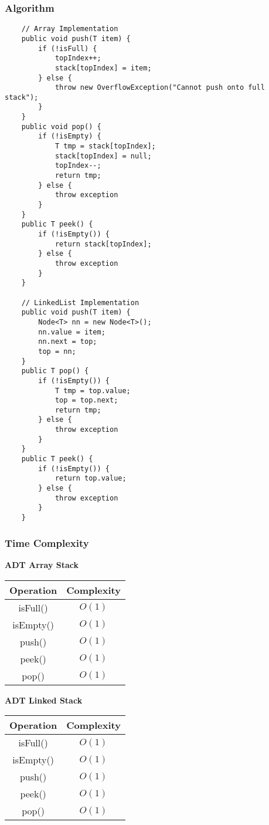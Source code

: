 \documentclass[10pt, 
a4paper, 
oneside, 
headinclude, footinclude, 
BCOR5mm]
{scrartcl}
\begin{document}
\subsubsection{Algorithm}
\begin{lstlisting}
    // Array Implementation
    public void push(T item) {
        if (!isFull) {
            topIndex++;
            stack[topIndex] = item;
        } else {
            throw new OverflowException("Cannot push onto full stack");
        }
    }
    public void pop() {
        if (!isEmpty) {
            T tmp = stack[topIndex];
            stack[topIndex] = null;
            topIndex--;
            return tmp;
        } else {
            throw exception
        }
    }
    public T peek() {
        if (!isEmpty()) {
            return stack[topIndex];
        } else {
            throw exception
        }
    }

    // LinkedList Implementation
    public void push(T item) {
        Node<T> nn = new Node<T>();
        nn.value = item;
        nn.next = top;
        top = nn;
    }
    public T pop() {
        if (!isEmpty()) {
            T tmp = top.value;
            top = top.next;
            return tmp;
        } else {
            throw exception
        }
    }
    public T peek() {
        if (!isEmpty()) {
            return top.value;
        } else {
            throw exception
        }
    }
\end{lstlisting}
\newpage
\subsubsection{Time Complexity}
\textbf{ADT Array Stack}
\begin{center}
    \begin{tabular}{|c|c|}
        \hline
        \textbf{Operation} & \textbf{Complexity} \\
        \hline
        isFull() & $O(1)$ \\
        \hline
        isEmpty() & $O(1)$ \\
        \hline
        push() & $O(1)$ \\
        \hline
        peek() & $O(1)$ \\
        \hline
        pop() & $O(1)$ \\
        \hline
    \end{tabular}
\end{center}
\textbf{ADT Linked Stack}
\begin{center}
    \begin{tabular}{|c|c|}
        \hline
        \textbf{Operation} & \textbf{Complexity} \\
        \hline
        isFull() & $O(1)$ \\
        \hline
        isEmpty() & $O(1)$ \\
        \hline
        push() & $O(1)$ \\
        \hline
        peek() & $O(1)$ \\
        \hline
        pop() & $O(1)$ \\
        \hline
    \end{tabular}
\end{center}
\newpage
\end{document}
